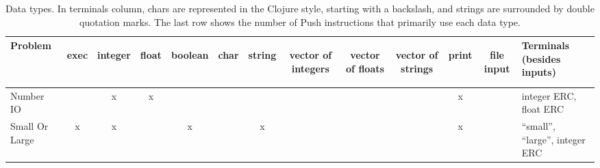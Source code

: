\documentclass{sig-alternate}
\begin{document}
\begin{table*}[h]
\centering
\caption{Data types. In terminals column, chars are represented in the Clojure style, starting with a backslash, and strings are surrounded by double quotation marks. The last row shows the number of Push instructions that primarily use each data type.}
\begin{tabular}{|l|ccccccccccc|p{6cm}|}
\hline
Problem                    & \begin{sideways}exec\end{sideways} & \begin{sideways}integer\end{sideways} & \begin{sideways}float\end{sideways} & \begin{sideways}boolean\end{sideways} & \begin{sideways}char\end{sideways} &  \begin{sideways}string\end{sideways} & \begin{sideways}vector of integers \- \end{sideways} & \begin{sideways}vector of floats\end{sideways} & \begin{sideways}vector of strings\end{sideways} & \begin{sideways}print\end{sideways} & \begin{sideways}file input\end{sideways} & Terminals (besides inputs) \\
\hline
Number IO                  &      & x       & x     &         &      &        &                    &                  &                   & x     &            & integer ERC, float ERC                                                                                                                                                                                                      \\
Small Or Large             & x    & x       &       & x       &      & x      &                    &                  &                   & x     &            & ``small'', ``large'', integer ERC                                                                                                                                                                                               \\

\end{tabular}
\end{table*}
\end{document}
